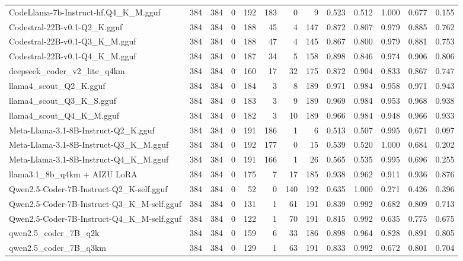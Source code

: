 \begin{table}[htbp]
{\begin{tabular}{lrrrrrrrrrrrr}
    CodeLlama-7b-Instruct-hf.Q4\_K\_M.gguf & 384 & 384 & 0 & 192 & 183 & 0 & 9 & 0.523 & 0.512 & 1.000 & 0.677 & 0.155 \\
    Codestral-22B-v0.1-Q2\_K.gguf & 384 & 384 & 0 & 188 & 45 & 4 & 147 & 0.872 & 0.807 & 0.979 & 0.885 & 0.762 \\
    Codestral-22B-v0.1-Q3\_K\_M.gguf & 384 & 384 & 0 & 188 & 47 & 4 & 145 & 0.867 & 0.800 & 0.979 & 0.881 & 0.753 \\
    Codestral-22B-v0.1-Q4\_K\_M.gguf & 384 & 384 & 0 & 187 & 34 & 5 & 158 & 0.898 & 0.846 & 0.974 & 0.906 & 0.806 \\
    deepseek\_coder\_v2\_lite\_q4km & 384 & 384 & 0 & 160 & 17 & 32 & 175 & 0.872 & 0.904 & 0.833 & 0.867 & 0.747 \\
    llama4\_scout\_Q2\_K.gguf & 384 & 384 & 0 & 184 & 3 & 8 & 189 & 0.971 & 0.984 & 0.958 & 0.971 & \cellcolor{green!10}0.943 \\
    llama4\_scout\_Q3\_K\_S.gguf & 384 & 384 & 0 & 183 & 3 & 9 & 189 & 0.969 & 0.984 & 0.953 & 0.968 & 0.938 \\
    llama4\_scout\_Q4\_K\_M.gguf & 384 & 384 & 0 & 182 & 3 & 10 & 189 & 0.966 & 0.984 & 0.948 & 0.966 & 0.933 \\
    Meta-Llama-3.1-8B-Instruct-Q2\_K.gguf & 384 & 384 & 0 & 191 & 186 & 1 & 6 & 0.513 & 0.507 & 0.995 & 0.671 & 0.097 \\
    Meta-Llama-3.1-8B-Instruct-Q3\_K\_M.gguf & 384 & 384 & 0 & 192 & 177 & 0 & 15 & 0.539 & 0.520 & 1.000 & 0.684 & 0.202 \\
    Meta-Llama-3.1-8B-Instruct-Q4\_K\_M.gguf & 384 & 384 & 0 & 191 & 166 & 1 & 26 & 0.565 & 0.535 & 0.995 & 0.696 & 0.255 \\
    llama3.1\_8b\_q4km + AIZU LoRA & 384 & 384 & 0 & 175 & 7 & 17 & 185 & 0.938 & 0.962 & 0.911 & 0.936 & 0.876 \\
    Qwen2.5-Coder-7B-Instruct-Q2\_K-self.gguf & 384 & 384 & 0 & 52 & 0 & 140 & 192 & 0.635 & 1.000 & 0.271 & 0.426 & 0.396 \\
    Qwen2.5-Coder-7B-Instruct-Q3\_K\_M-self.gguf & 384 & 384 & 0 & 131 & 1 & 61 & 191 & 0.839 & 0.992 & 0.682 & 0.809 & 0.713 \\
    Qwen2.5-Coder-7B-Instruct-Q4\_K\_M-self.gguf & 384 & 384 & 0 & 122 & 1 & 70 & 191 & 0.815 & 0.992 & 0.635 & 0.775 & 0.675 \\
    qwen2.5\_coder\_7B\_q2k & 384 & 384 & 0 & 159 & 6 & 33 & 186 & 0.898 & 0.964 & 0.828 & 0.891 & 0.805 \\
    qwen2.5\_coder\_7B\_q3km & 384 & 384 & 0 & 129 & 1 & 63 & 191 & 0.833 & 0.992 & 0.672 & 0.801 & 0.704 \\

\end{tabular}}
\end{table}
